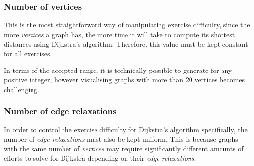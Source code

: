 \documentclass{l4proj}
\begin{document}
\subsubsection{Number of vertices}

This is the most straightforward way of manipulating exercise difficulty, since the more \emph{vertices} a graph has, the more time it will take to compute its shortest distances using Dijkstra's algorithm. Therefore, this value must be kept constant for all exercises. 

In terms of the accepted range, it is technically possible to generate for any positive integer, however visualising graphs with more than 20 vertices becomes challenging.

\subsubsection{Number of edge relaxations}
\label{sec:ernum}

In order to control the exercise difficulty for Dijkstra's algorithm specifically, the number of \emph{edge relaxations} must also be kept uniform. This is because graphs with the same number of \emph{vertices} may require significantly different amounts of efforts to solve for Dijkstra depending on their \emph{edge relaxations}. 
\end{document}
